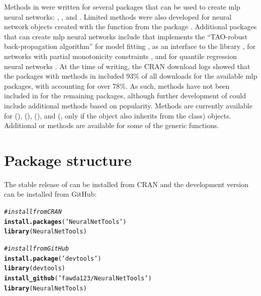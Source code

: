 \documentclass[article,shortnames]{jss}\usepackage[]{graphicx}\usepackage[]{color}
\makeatletter
\newcommand{\hlstr}[1]{\textcolor[rgb]{0.192,0.494,0.8}{#1}}%
\newcommand{\hlcom}[1]{\textcolor[rgb]{0.678,0.584,0.686}{\textit{#1}}}%
\newcommand{\hlstd}[1]{\textcolor[rgb]{0.345,0.345,0.345}{#1}}%
\newcommand{\hlkwd}[1]{\textcolor[rgb]{0.737,0.353,0.396}{\textbf{#1}}}%
\newenvironment{kframe}{%
 \def\at@end@of@kframe{}%
 \ifinner\ifhmode%
  \def\at@end@of@kframe{\end{minipage}}%
  \begin{minipage}{\columnwidth}%
 \fi\fi%
 \def\FrameCommand##1{\hskip\@totalleftmargin \hskip-\fboxsep
 \colorbox{shadecolor}{##1}\hskip-\fboxsep
     \hskip-\linewidth \hskip-\@totalleftmargin \hskip\columnwidth}%
 \MakeFramed {\advance\hsize-\width
   \@totalleftmargin\z@ \linewidth\hsize
   \@setminipage}}%
 {\par\unskip\endMakeFramed%
 \at@end@of@kframe}
\makeatother
\begin{document}
Methods in  were written for several  packages that can be used to create \ac{mlp} neural networks:  \citep{Fritsch12},  \citep{Venables02}, and  \citep{Bergmeir12}. Limited methods were also developed for neural network objects created with the  function from the  package \citep{Kuhn15}.  Additional  packages that can create \ac{mlp} neural networks include  that implements the ``TAO-robust back-propagation algorithm'' for model fitting \citep{Castejon14},  as an  interface to the   library \citep{Klima15},  for networks with partial monotonicity constraints \citep{Cannon15}, and  for quantile regression neural networks \citep{Cannon11}.  At the time of writing, the CRAN download logs \citep{Csardi15} showed that the  packages with methods in  included 93\% of all downloads for the available \ac{mlp} packages, with  accounting for over 78\%.  As such, methods have not been included in  for the remaining packages, although further development of  could include additional methods based on popularity.  Methods are currently available for   (),  (),  (), and  (, only if the object also inherits from the  class) objects.  Additional  or  methods are available for some of the generic functions.

\section[Package structure]{Package structure}

The stable release of  can be installed from CRAN and the development version can be installed from GitHub:

\begin{kframe}
\begin{alltt}
\hlcom{# install from CRAN}
\hlkwd{install.packages}\hlstd{(}\hlstr{'NeuralNetTools'}\hlstd{)}
\hlkwd{library}\hlstd{(NeuralNetTools)}

\hlcom{# install from GitHub}
\hlkwd{install.package}\hlstd{(}\hlstr{'devtools'}\hlstd{)}
\hlkwd{library}\hlstd{(devtools)}
\hlkwd{install_github}\hlstd{(}\hlstr{'fawda123/NeuralNetTools'}\hlstd{)}
\hlkwd{library}\hlstd{(NeuralNetTools)}
\end{alltt}
\end{kframe}
\end{document}
